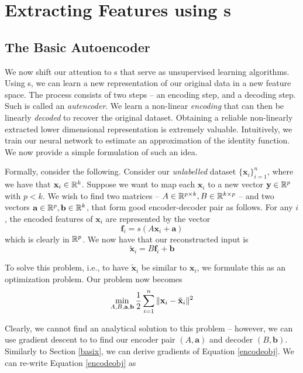 \section{Extracting Features using \ann{}s}

\subsection{The Basic Autoencoder}

We now shift our attention to \ann{}s that serve as unsupervised learning algorithms. Using \ann{}s, we can learn a new representation of our original data in a new feature space. The process  consists of two steps -- an encoding step, and a decoding step. Such \ann{} is called an \emph{autencoder}. We learn a non-linear \emph{encoding} that can then be linearly \emph{decoded} to recover the original dataset. Obtaining a reliable non-linearly extracted lower dimensional representation is extremely valuable. Intuitively, we train our neural network to estimate an approximation of the identity function. We now provide a simple formulation of such an idea.

Formally, consider the following. Consider our \emph{unlabelled} dataset $\{\mathbf{x}_i\}_{i=1}^n$, where we have that $\mathbf{x}_i\in\mathbb{R}^k$. Suppose we want to map each $\mathbf{x}_i$ to a new vector $\mathbf{y}\in\mathbb{R}^p$ with $p < k$. We wish to find two matrices -- $A\in\mathbb{R}^{p\times k}, B\in\mathbb{R}^{k\times p}$ -- and two vectors  $\mathbf{a}\in\mathbb{R}^p, \mathbf{b}\in\mathbb{R}^k$, that form good encoder-decoder pair as follows. For any $i$, the encoded features of $\mathbf{x}_i$ are represented by the vector 
\begin{equation}
\mathbf{f}_i = s(A\mathbf{x}_i + \mathbf{a})
\end{equation} 
which is clearly in $\mathbb{R}^p$. We now have that our reconstructed input is 
\begin{equation}
\tilde{\mathbf{x}}_i = B\mathbf{f}_i+\mathbf{b}
\end{equation}

To solve this problem, i.e., to have $\tilde{\mathbf{x}}_i$ be similar to $\mathbf{x}_i$, we formulate this as an optimization problem. Our problem now becomes
\begin{equation}
\label{encodeobj}
\min_{A, B, \mathbf{a},\mathbf{b}} \frac{1}{2}\sum_{i = 1}^{n} \Vert \mathbf{x}_i - \tilde{\mathbf{x}}_i \Vert ^ 2
\end{equation}

Clearly, we cannot find an analytical solution to this problem -- however, we can use gradient descent to to find our encoder pair $(A,\mathbf{a})$ and decoder $(B, \mathbf{b})$. Similarly to Section \ref{basix}, we can derive gradients of Equation \eqref{encodeobj}. We can re-write Equation \eqref{encodeobj} as 

